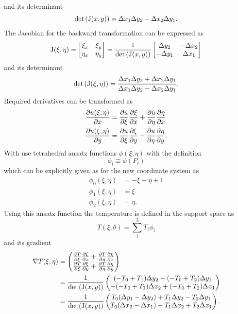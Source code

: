 and its determinant
\begin{equation}
	\det\left(\mathrm{J}(x, y)\right) = \Delta x_1 \Delta y_2 - \Delta x_2 \Delta y_1.
\end{equation}
The Jacobian for the backward transformation can be expressed as
\begin{equation}
	\mathrm{J}(\xi, \eta) = 
	\begin{bmatrix}
	\xi_{x} & \xi_{y} \\
	\eta_{x} & \eta_{y}
	\end{bmatrix}
	= \frac{1}{\det\left(\mathrm{J}(x,y)\right)}
	\begin{bmatrix}
	\Delta y_{2} & -\Delta x_{2}\\
	-\Delta y_{1} & \Delta x_{1}
	\end{bmatrix}
\end{equation}
and its determinant
\begin{equation}
	\det\left( \mathrm{J}(\xi, \eta) \right) = \frac{\Delta x_1 \Delta y_2 + \Delta x_2 \Delta y_1}{\Delta x_1 \Delta y_2 - \Delta x_2 \Delta y_1}.
\end{equation}
Required derivatives can be transformed as
\begin{align}
	\pdv{u(\xi, \eta)}{x} &= \pdv{u}{\xi}\pdv{\xi}{x} + \pdv{u}{\eta}\pdv{\eta}{x}\\
	\pdv{u(\xi, \eta)}{y} &= \pdv{u}{\xi}\pdv{\xi}{y} + \pdv{u}{\eta}\pdv{\eta}{y}.
\end{align}
With use tetrahedral ansatz functions $\phi(\xi, \eta)$ with the definition
\begin{equation}
	\phi_i \equiv \phi(P_i)
\end{equation}
which can be explicitly given as for the new coordinate system as
\begin{align}
	\phi_0(\xi, \eta) &= -\xi - \eta  + 1\\
	\phi_1(\xi, \eta) &= \xi\\
	\phi_2(\xi, \eta) &= \eta.
\end{align}
Using this ansatz function the temperature is defined in the support space as
\begin{equation}
	T(\xi, \theta)  = \sum_i^3 T_i \phi_i
\end{equation}
and its gradient
\begin{align}
	\nabla T(\xi, \eta) &=
	\begin{pmatrix}
	\pdv{T}{\xi}\pdv{\xi}{x} + \pdv{T}{\eta}\pdv{\eta}{x}\\
	\pdv{T}{\xi}\pdv{\xi}{y} + \pdv{T}{\eta}\pdv{\eta}{y}
	\end{pmatrix}\\
	&= \frac{1}{\det\left(\mathrm{J}(x,y)\right)}
	\begin{pmatrix}
	(-T_0 + T_1)\Delta y_2 - (-T_0 + T_2)\Delta y_1\\
	-(-T_0 + T_1)\Delta x_2 + (-T_0 + T_2)\Delta x_1
	\end{pmatrix}\\
	&= \frac{1}{\det\left(\mathrm{J}(x,y)\right)}
	\begin{pmatrix}
	T_0(\Delta y_1 - \Delta y_2) + T_1\Delta y_2 - T_2\Delta y_1\\
	T_0(\Delta x_2 - \Delta x_1) - T_1 \Delta x_2 + T_2 \Delta x_1
	\end{pmatrix}.
\end{align}

